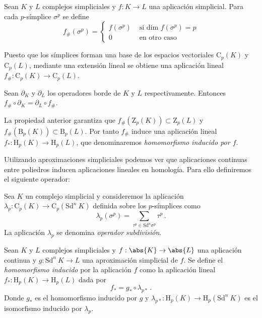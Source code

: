 Sean $K$ y $L$ complejos simpliciales y $f: K \to L$ una aplicación simplicial. Para cada $p$-símplice $\sigma^p$ se define
\[
f_{\#}(\sigma^p) = 
\begin{cases}
f(\sigma^p)	& \text{ si } \text{dim } f(\sigma^p) = p \\ 
0 			& \text{ en otro caso }
\end{cases}
\]

Puesto que los símplices forman una base de los espacios vectoriales $\text{C}_p(K)$ y $\text{C}_p(L)$, mediante una extensión lineal se obtiene una aplicación lineal $f_{\#}: \text{C}_p(K) \to \text{C}_p(L)$.

\begin{property}
Sean $\partial_K$ y $\partial_L$ los operadores borde de $K$ y $L$ respectivamente. Entonces $f_{\#}\circ \partial_K = \partial_L \circ f_{\#}$.
\end{property}
La propiedad anterior garantiza que $f_{\#}(\text{Z}_p(K)) \subset \text{Z}_p(L)$ y $f_{\#}(\text{B}_p(K)) \subset \text{B}_p(L)$. Por tanto $f_{\#}$ induce una aplicación lineal $f_{*}: \text{H}_p(K) \to \text{H}_p(L)$, que denominaremos \emph{homomorfismo inducido por $f$}.

Utilizando aproximaciones simpliciales podemos ver que aplicaciones continuas entre poliedros inducen aplicaciones lineales en homología. Para ello definiremos el siguiente operador:

\begin{definition}
\begin{sloppypar}
Sea $K$ un complejo simplicial y consideremos la aplicación ${\lambda_p: \text{C}_p(K) \to \text{C}_p(\text{Sd}^n\ K)}$ definida sobre los $p$-símplices como
\[
\lambda_p(\sigma^p) = \sum_{\tau^p \in \text{Sd}^n \sigma^p} \tau^p\,.
\]
La aplicación $\lambda_p$ se denomina \emph{operador subdivisión}.
\end{sloppypar} 
\end{definition}

\begin{sloppypar}
Sean $K$ y $L$ complejos simpliciales y ${f: \abs{K} \to \abs{L}}$ una aplicación continua y ${g: \text{Sd}^n\ K \to L}$ una aproximación simplicial de $f$. Se define el \emph{homomorfismo inducido} por la aplicación $f$ como la aplicación lineal ${f_{*}: \text{H}_p(K) \to \text{H}_p(L)}$ dada por
\[
f_{*} = g_{*} \circ \lambda_{p*}\,.
\]
Donde $g_{*}$ es el homomorfismo inducido por $g$ y ${\lambda_{p*}: \text{H}_p(K) \to \text{H}_p(\text{Sd}^n\ K)}$ es el isomorfismo inducido por $\lambda_p$.
\end{sloppypar}

